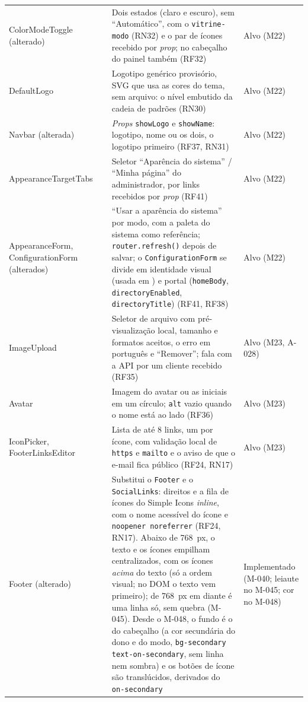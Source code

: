 \begin{longtable}{@{}L{3.3cm}L{2.9cm}L{6.0cm}L{2.2cm}@{}}
ColorModeToggle (alterado) &  & Dois estados (claro e escuro), sem ``Automático'', com o  \texttt{vitrine-modo} (RN32) e o par de ícones recebido por \emph{prop}; no cabeçalho do painel também (RF32) & Alvo (M22)\\
DefaultLogo &  & Logotipo genérico provisório, SVG  que usa as cores do tema, sem arquivo: o nível embutido da cadeia de padrões (RN30) & Alvo (M22)\\
Navbar (alterada) &  & \emph{Props} \texttt{showLogo} e \texttt{showName}: logotipo, nome ou os dois, o logotipo primeiro (RF37, RN31) & Alvo (M22)\\
AppearanceTargetTabs &  & Seletor ``Aparência do sistema'' / ``Minha página'' do administrador, por links recebidos por \emph{prop} (RF41) & Alvo (M22)\\
AppearanceForm, ConfigurationForm (alterados) &  & ``Usar a aparência do sistema'' por modo, com a paleta do sistema como referência; \texttt{router.refresh()} depois de salvar; o \texttt{ConfigurationForm} se divide em identidade visual (usada em ) e portal (\texttt{homeBody}, \texttt{directoryEnabled}, \texttt{directoryTitle}) (RF41, RF38) & Alvo (M22)\\
ImageUpload &  & Seletor de arquivo com pré-visualização local, tamanho e formatos aceitos, o erro  em português e ``Remover''; fala com a API por um cliente recebido (RF35) & Alvo (M23, A-028)\\
Avatar &  & Imagem do avatar ou as iniciais em um círculo; \texttt{alt} vazio quando o nome está ao lado (RF36) & Alvo (M23)\\
IconPicker, FooterLinksEditor &  & Lista de até 8 links, um por ícone, com validação local de \texttt{https} e \texttt{mailto} e o aviso de que o e-mail fica público (RF24, RN17) & Alvo (M23)\\
Footer (alterado) &  & Substitui o \texttt{Footer} e o \texttt{SocialLinks}: direitos e a fila de ícones do Simple Icons \emph{inline}, com o nome acessível do ícone e \texttt{noopener noreferrer} (RF24, RN17). Abaixo de 768~px, o texto e os ícones empilham centralizados, com os ícones \emph{acima} do texto (só a ordem visual; no DOM o texto vem primeiro); de 768~px em diante é uma linha só, sem quebra (M-045). Desde o M-048, o fundo é o do cabeçalho (a cor secundária do dono e do modo, \texttt{bg-secondary text-on-secondary}, sem linha nem sombra) e os botões de ícone são translúcidos, derivados do \texttt{on-secondary} & Implementado (M-040; leiaute no M-045; cor no M-048)\\

\end{longtable}
